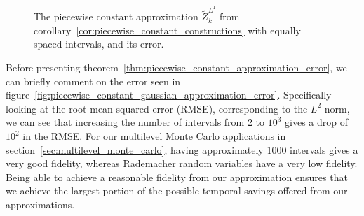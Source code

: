 \documentclass[manuscript,review]{acmart}
\begin{document}
\begin{figure}[htb]
\centering

\hfil
{}\hfil
{}\hfil

\caption{The piecewise constant approximation $ \widetilde{Z}_k^{L^1} $ from corollary~\ref{cor:piecewise_constant_constructions} with equally spaced intervals, and its error.}
\label{fig:piecewise_constant_approximation}
\end{figure}

Before presenting theorem~\ref{thm:piecewise_constant_approximation_error}, we can briefly comment on the error seen in figure~\ref{fig:piecewise_constant_gaussian_approximation_error}. Specifically looking at the root mean squared error (RMSE), corresponding to the $ L^2 $ norm, we can see that increasing the number of intervals from 2 to $ 10^3 $ gives a drop of $ 10^2 $ in the RMSE. For our multilevel Monte Carlo applications in section~\ref{sec:multilevel_monte_carlo}, having approximately 1000 intervals gives a very good fidelity, whereas Rademacher random variables have a very low fidelity. Being able to achieve a reasonable fidelity from our approximation ensures that we achieve the largest portion of the possible temporal savings offered from our approximations. 
\end{document}
